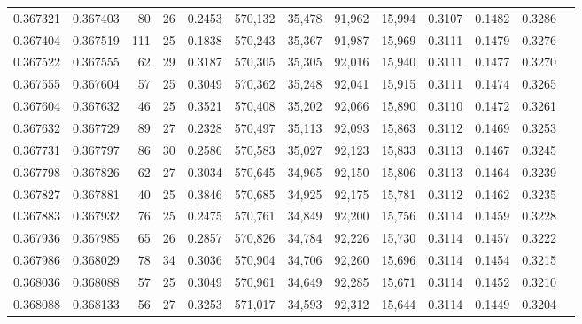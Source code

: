 \begin{tabular}{rrrrrrrrrrrrr}
0.367321 & 0.367403 &    80 &  26 &                                     0.2453 & 570,132 &  35,478 &  91,962 &  15,994 & 0.3107 & 0.1482 & 0.3286 \\
0.367404 & 0.367519 &   111 &  25 &                                     0.1838 & 570,243 &  35,367 &  91,987 &  15,969 & 0.3111 & 0.1479 & 0.3276 \\
0.367522 & 0.367555 &    62 &  29 &                                     0.3187 & 570,305 &  35,305 &  92,016 &  15,940 & 0.3111 & 0.1477 & 0.3270 \\
0.367555 & 0.367604 &    57 &  25 &                                     0.3049 & 570,362 &  35,248 &  92,041 &  15,915 & 0.3111 & 0.1474 & 0.3265 \\
0.367604 & 0.367632 &    46 &  25 &                                     0.3521 & 570,408 &  35,202 &  92,066 &  15,890 & 0.3110 & 0.1472 & 0.3261 \\
0.367632 & 0.367729 &    89 &  27 &                                     0.2328 & 570,497 &  35,113 &  92,093 &  15,863 & 0.3112 & 0.1469 & 0.3253 \\
0.367731 & 0.367797 &    86 &  30 &                                     0.2586 & 570,583 &  35,027 &  92,123 &  15,833 & 0.3113 & 0.1467 & 0.3245 \\
0.367798 & 0.367826 &    62 &  27 &                                     0.3034 & 570,645 &  34,965 &  92,150 &  15,806 & 0.3113 & 0.1464 & 0.3239 \\
0.367827 & 0.367881 &    40 &  25 &                                     0.3846 & 570,685 &  34,925 &  92,175 &  15,781 & 0.3112 & 0.1462 & 0.3235 \\
0.367883 & 0.367932 &    76 &  25 &                                     0.2475 & 570,761 &  34,849 &  92,200 &  15,756 & 0.3114 & 0.1459 & 0.3228 \\
0.367936 & 0.367985 &    65 &  26 &                                     0.2857 & 570,826 &  34,784 &  92,226 &  15,730 & 0.3114 & 0.1457 & 0.3222 \\
0.367986 & 0.368029 &    78 &  34 &                                     0.3036 & 570,904 &  34,706 &  92,260 &  15,696 & 0.3114 & 0.1454 & 0.3215 \\
0.368036 & 0.368088 &    57 &  25 &                                     0.3049 & 570,961 &  34,649 &  92,285 &  15,671 & 0.3114 & 0.1452 & 0.3210 \\
0.368088 & 0.368133 &    56 &  27 &                                     0.3253 & 571,017 &  34,593 &  92,312 &  15,644 & 0.3114 & 0.1449 & 0.3204 \\

\end{tabular}
